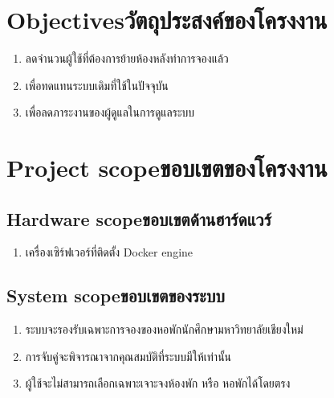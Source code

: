 
\section{\ifenglish Objectives\else วัตถุประสงค์ของโครงงาน\fi}
\begin{enumerate}
    \item ลดจำนวนผู้ใช้ที่ต้องการย้ายห้องหลังทำการจองแล้ว
    \item เพื่อทดแทนระบบเดิมที่ใช้ในปัจจุบัน
    \item เพื่อลดภาระงานของผู้ดูแลในการดูแลระบบ
\end{enumerate}

\section{\ifenglish Project scope\else ขอบเขตของโครงงาน\fi}
\subsection{\ifenglish Hardware scope\else ขอบเขตด้านฮาร์ดแวร์\fi}
\begin{enumerate}
    \item เครื่องเซิร์ฟเวอร์ที่ติดตั้ง Docker engine
\end{enumerate}
\subsection{\ifenglish System scope\else ขอบเขตของระบบ\fi}
\begin{enumerate}
    \item ระบบจะรองรับเฉพาะการจองของหอพักนักศึกษามหาวิทยาลัยเชียงใหม่
    \item การจับคู่จะพิจารณาจากคุณสมบัติที่ระบบมีให้เท่านั้น
    \item ผู้ใช้จะไม่สามารถเลือกเฉพาะเจาะจงห้องพัก หรือ หอพักได้โดยตรง
\end{enumerate}


